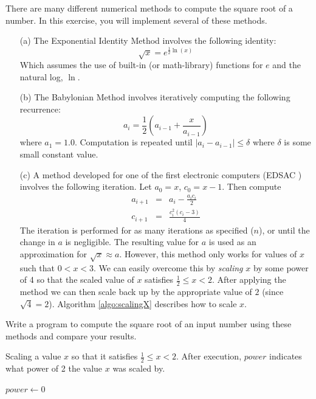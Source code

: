 \begin{exer}
\label{exercise:loops:squareRoots}
There are many different numerical methods to compute the square root of a number.  In
this exercise, you will implement several of these methods.

\begin{enumerate}
  \item[(a)] The Exponential Identity Method involves the following identity:
           $$\sqrt{x} = e^{\frac{1}{2}\ln{(x)}}$$
	Which assumes the use of built-in (or math-library) functions for $e$ and the natural log, $\ln$.
  \item[(b)] The Babylonian Method involves iteratively computing the following recurrence:
	$$a_{i} = \frac{1}{2}\left( a_{i-1} + \frac{x}{a_{i-1}} \right)$$
	where $a_1 = 1.0$.  Computation is repeated until $|a_{i} - a_{i-1}| \leq \delta$ where 
	$\delta$ is some small constant value.
  \item[(c)] A method developed for one of the first electronic computers (EDSAC \cite{WilkesWheelerGill1952}) involves the following iteration.
	Let $a_0 = x$, $c_0 = x-1$.  Then compute
	$$\begin{array}{rcl}
	    a_{i+1} & = & a_i - \frac{a_ic_i}{2} \\
	    c_{i+1} & = & \frac{c_i^2(c_i - 3)}{4} 
 	\end{array}$$
	The iteration is performed for as many iterations as specified ($n$), or until the change in $a$ is negligible.
	The resulting value for $a$ is used as an approximation for $\sqrt{x} \approx a$.
	However, this method only works for values of $x$ such that $0 < x < 3$.  
	We can easily overcome this by \emph{scaling} $x$ by some power of 4 so that
	the scaled value of $x$ satisfies $\frac{1}{2} \leq x < 2$.  After applying the method we
	can then scale back up by the appropriate value of $2$ (since $\sqrt{4} = 2$).  
	Algorithm \ref{algo:scalingX} describes how to scale $x$.
\end{enumerate}

Write a program to compute the square root of an input number using 
these methods and compare your results.

\begin{algorithm}[H]
\caption[Scaling a Value]{Scaling a value $x$ so that it satisfies $\frac{1}{2} \leq x < 2$.  After
execution, $power$ indicates what power of 2 the value $x$ was scaled by.}
\label{algo:scalingX}
$power \leftarrow 0$ \;
\end{algorithm}

\end{exer}

